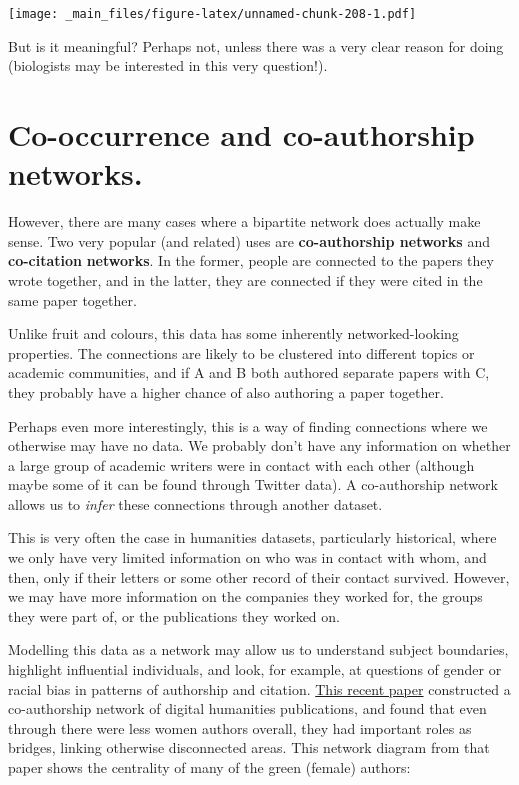 \documentclass[
]{book}
\begin{document}
\texttt{[image: \_main\_files/figure-latex/unnamed-chunk-208-1.pdf]}

But is it meaningful? Perhaps not, unless there was a very clear reason for doing (biologists may be interested in this very question!).

\hypertarget{co-occurrence-and-co-authorship-networks.}{%
\section{Co-occurrence and co-authorship networks.}\label{co-occurrence-and-co-authorship-networks.}}

However, there are many cases where a bipartite network does actually make sense. Two very popular (and related) uses are \textbf{co-authorship networks} and \textbf{co-citation} \textbf{networks}. In the former, people are connected to the papers they wrote together, and in the latter, they are connected if they were cited in the same paper together.

Unlike fruit and colours, this data has some inherently networked-looking properties. The connections are likely to be clustered into different topics or academic communities, and if A and B both authored separate papers with C, they probably have a higher chance of also authoring a paper together.

Perhaps even more interestingly, this is a way of finding connections where we otherwise may have no data. We probably don't have any information on whether a large group of academic writers were in contact with each other (although maybe some of it can be found through Twitter data). A co-authorship network allows us to \emph{infer} these connections through another dataset.

This is very often the case in humanities datasets, particularly historical, where we only have very limited information on who was in contact with whom, and then, only if their letters or some other record of their contact survived. However, we may have more information on the companies they worked for, the groups they were part of, or the publications they worked on.

Modelling this data as a network may allow us to understand subject boundaries, highlight influential individuals, and look, for example, at questions of gender or racial bias in patterns of authorship and citation. \href{https://doi.org/10.1108/JD-11-2021-0221}{This recent paper} constructed a co-authorship network of digital humanities publications, and found that even through there were less women authors overall, they had important roles as bridges, linking otherwise disconnected areas. This network diagram from that paper shows the centrality of many of the green (female) authors:
\end{document}
